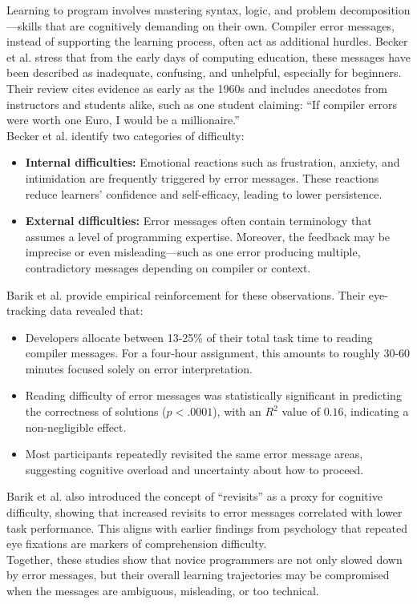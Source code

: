 Learning to program involves mastering syntax, logic, and problem decomposition—skills that are cognitively demanding on their own.
Compiler error messages, instead of supporting the learning process, often act as additional hurdles.
Becker et al. \cite{becker} stress that from the early days of computing education, these messages have been described as inadequate, confusing, and unhelpful, especially for beginners.
Their review cites evidence as early as the 1960s and includes anecdotes from instructors and students alike, such as one student claiming: ``If compiler errors were worth one Euro, I would be a millionaire.''\\[5pt]
\noindent Becker et al. identify two categories of difficulty:

\begin{itemize}
    \item \textbf{Internal difficulties:} Emotional reactions such as frustration, anxiety, and intimidation are frequently triggered by error messages.
        These reactions reduce learners' confidence and self-efficacy, leading to lower persistence.
    \item \textbf{External difficulties:} Error messages often contain terminology that assumes a level of programming expertise.
        Moreover, the feedback may be imprecise or even misleading—such as one error producing multiple, contradictory messages depending on compiler or context.
\end{itemize}

\noindent Barik et al. \cite{barik} provide empirical reinforcement for these observations.
Their eye-tracking data revealed that:

\begin{itemize}
    \item Developers allocate between 13-25\% of their total task time to reading compiler messages.
        For a four-hour assignment, this amounts to roughly 30-60 minutes focused solely on error interpretation.
    \item Reading difficulty of error messages was statistically significant in predicting the correctness of solutions (\(p < .0001\)), with an \(R^2\) value of \(0.16\), indicating a non-negligible effect.
    \item Most participants repeatedly revisited the same error message areas, suggesting cognitive overload and uncertainty about how to proceed.
\end{itemize}

\noindent Barik et al. also introduced the concept of ``revisits'' as a proxy for cognitive difficulty, showing that increased revisits to error messages correlated with lower task performance.
This aligns with earlier findings from psychology that repeated eye fixations are markers of comprehension difficulty.\\[5pt]
\noindent Together, these studies show that novice programmers are not only slowed down by error messages,
but their overall learning trajectories may be compromised when the messages are ambiguous, misleading, or too technical.

